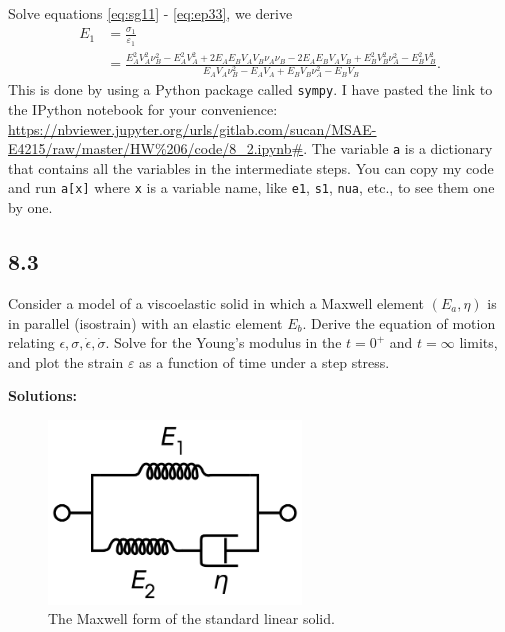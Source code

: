 \documentclass[12pt]{article}
\begin{document}
Solve equations \eqref{eq:sg11} - \eqref{eq:ep33}, we derive
\begin{equation}
  \begin{split}
    E_1 &= \frac{ \sigma_1 }{ \varepsilon_1 } \\
    &= \frac{E_{A}^{2} V_{A}^{2} \nu_{B}^{2} - E_{A}^{2} V_{A}^{2} + 2 E_{A} E_{B} V_{A} V_{B} \nu_{A} \nu_{B} - 2 E_{A} E_{B} V_{A} V_{B} + E_{B}^{2} V_{B}^{2} \nu_{A}^{2} - E_{B}^{2} V_{B}^{2}}{E_{A} V_{A} \nu_{B}^{2} - E_{A} V_{A} + E_{B} V_{B} \nu_{A}^{2} - E_{B} V_{B}}.
  \end{split}
\end{equation}
This is done by using a Python package called \texttt{sympy}. I have pasted the link
to the IPython notebook for your convenience:
\url{https://nbviewer.jupyter.org/urls/gitlab.com/sucan/MSAE-E4215/raw/master/HW%206/code/8_2.ipynb#}.
The variable \texttt{a} is a dictionary that contains all the variables in the intermediate
steps.
You can copy my code and run \texttt{a[x]} where \texttt{x} is a variable name, like
\texttt{e1}, \texttt{s1}, \texttt{nua}, etc., to see them one by one.

\subsection{8.3}
Consider a model of a viscoelastic solid in which a Maxwell element $(E_a, \eta)$ is in
parallel (isostrain) with an elastic element $E_b$.
Derive the equation of motion relating $\epsilon,\sigma,\dot{\epsilon},\dot{\sigma}$.
Solve for the Young's modulus in the $t=0^+$ and $t=\infty$ limits, and plot
the strain $\varepsilon$ as a function of time under a step stress.

\textbf{Solutions:}
\begin{figure}[h]
  \centering
  \includegraphics[width=0.6\textwidth]{images/Maxwell}
  \caption{The Maxwell form of the standard linear solid.}
  \label{fig:Maxwell}
\end{figure}
\end{document}
